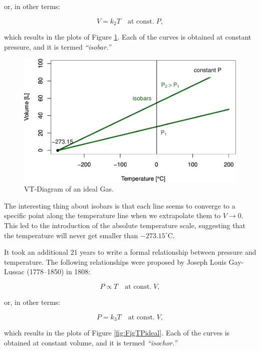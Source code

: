 \documentclass[
  9pt,
]{extbook}
\theoremstyle{definition}
\theoremstyle{definition}
\theoremstyle{definition}
\theoremstyle{remark}
\begin{document}
or, in other terms:

\begin{equation}
V=k_2 T\quad\text{at const.}\;P,
\label{eq:charleslaw2}
\end{equation}

which results in the plots of Figure \ref{fig:FigTVideal}. Each of the curves is obtained at constant pressure, and it is termed \emph{``isobar.''}

\begin{figure}

{\centering \includegraphics[width=0.7\linewidth]{pchem1_files/figure-latex/FigTVideal-1} 

}

\caption{VT-Diagram of an ideal Gas.}\label{fig:FigTVideal}
\end{figure}

The interesting thing about isobars is that each line seems to converge to a specific point along the temperature line when we extrapolate them to \(V\rightarrow 0\). This led to the introduction of the absolute temperature scale, suggesting that the temperature will never get smaller than \(-273.15^\circ\mathrm{C}\).

It took an additional 21 years to write a formal relationship between pressure and temperature. The following relationships were proposed by Joseph Louis Gay-Lussac (1778--1850) in 1808:

\begin{equation}
P\propto T\quad\text{at const.}\;V,
\label{eq:gaylussac1}
\end{equation}

or, in other terms:

\begin{equation}
P=k_3 T\quad\text{at const.}\;V,
\label{eq:gaylussac2}
\end{equation}

which results in the plots of Figure \ref{fig:FigTPideal}. Each of the curves is obtained at constant volume, and it is termed \emph{``isochor.''}
\end{document}
